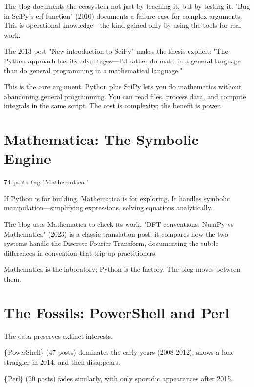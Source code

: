 The blog documents the ecosystem not just by teaching it, but by testing it. "Bug in SciPy's erf function" (2010) documents a failure case for complex arguments. This is operational knowledge—the kind gained only by using the tools for real work.

The 2013 post "New introduction to SciPy" makes the thesis explicit: "The Python approach has its advantages—I'd rather do math in a general language than do general programming in a mathematical language."

This is the core argument. Python plus SciPy lets you do mathematics without abandoning general programming. You can read files, process data, and compute integrals in the same script. The cost is complexity; the benefit is power.



\bigskip

\section*{Mathematica: The Symbolic Engine}

74 posts tag "Mathematica."

If Python is for building, Mathematica is for exploring. It handles symbolic manipulation—simplifying expressions, solving equations analytically.

The blog uses Mathematica to check its work. "DFT conventions: NumPy vs Mathematica" (2023) is a classic translation post: it compares how the two systems handle the Discrete Fourier Transform, documenting the subtle differences in convention that trip up practitioners.

Mathematica is the laboratory; Python is the factory. The blog moves between them.

\bigskip

\section*{The Fossils: PowerShell and Perl}

The data preserves extinct interests.

\textbf\{PowerShell\} (47 posts) dominates the early years (2008-2012), shows a lone straggler in 2014, and then disappears.

\textbf\{Perl\} (20 posts) fades similarly, with only sporadic appearances after 2015.

